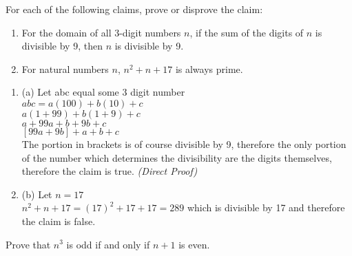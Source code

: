 \documentclass[11pt]{amsart}
\newcommand{\be}{\begin{enumerate}}
\newcommand{\ee}{\end{enumerate}}
\begin{document}

\item For each of the following claims, prove or disprove the claim:
	\be
		\item For the domain of all 3-digit numbers $n$, if the sum of the digits of $n$ is divisible by 9, then $n$ is divisible by 9.
		\item For natural numbers $n$, $n^2+n+17$ is always prime.
	\ee

	\begin{sol}
		\be
			\item[(a)] Let abc equal some 3 digit number\\
			$abc = a(100) + b(10) + c$\\
			$a(1 + 99) + b(1 + 9) + c$\\
			$a + 99a + b + 9b + c$\\
			$[99a + 9b] + a + b + c$\\
			The portion in brackets is of course divisible by 9, therefore the only portion of the number which determines the divisibility are the digits themselves,  therefore the claim is true. \textit{(Direct Proof)}

			\item[(b)] Let $n=17$\\
			$n^2 + n + 17 = (17)^2 + 17 + 17 = 289$ which is divisible by 17 and therefore the claim is false.
		\ee
	\end{sol}
\item Prove that $n^3$ is odd if and only if $n+1$ is even.
\end{document}
